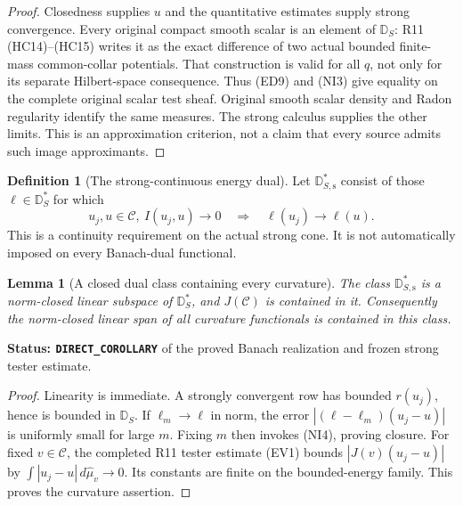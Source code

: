 \documentclass[11pt,a4paper]{article}
\numberwithin{equation}{section}
\newtheorem{lemma}[theorem]{Lemma}
\theoremstyle{definition}
\newtheorem{definition}[theorem]{Definition}
\theoremstyle{remark}
\begin{document}
\begin{proof}
Closedness supplies $u$ and the quantitative estimates supply
strong convergence. Every original compact smooth scalar is an
element of $\mathbb D_S$: R11 (HC14)--(HC15) writes it as the
exact difference of two actual bounded finite-mass common-collar
potentials. That construction is valid for all $q$, not only
for its separate Hilbert-space consequence. Thus (ED9) and
(NI3) give equality on the complete original scalar test sheaf.
Original smooth scalar density and Radon regularity identify
the same measures. The strong calculus supplies the other
limits. This is an approximation criterion, not a claim that
every source admits such image approximants.
\end{proof}

\begin{definition}[The strong-continuous energy dual]
\label{def:r12-strong-continuous-dual}
Let $\mathbb D_{S,\mathrm{s}}^*$ consist of those
$\ell\in\mathbb D_S^*$ for which
\[
  u_j,u\in\mathscr C,\ I(u_j,u)\to0
                 \quad\Longrightarrow\quad\ell(u_j)\to\ell(u).
 \tag{NI4}
\]
This is a continuity requirement on the actual strong cone.
It is not automatically imposed on every Banach-dual functional.
\end{definition}

\begin{lemma}[A closed dual class containing every curvature]
\label{lem:r12-strong-dual-closed}
The class $\mathbb D_{S,\mathrm{s}}^*$ is a norm-closed linear
subspace of $\mathbb D_S^*$, and $J(\mathscr C)$ is contained
in it. Consequently the norm-closed linear span of all curvature
functionals is contained in this class.
\end{lemma}

\noindent\textbf{Status: \texttt{DIRECT\_COROLLARY}} of the
proved Banach realization and frozen strong tester estimate.

\begin{proof}
Linearity is immediate. A strongly convergent row has bounded
$r(u_j)$, hence is bounded in $\mathbb D_S$. If $\ell_m\to\ell$
in norm, the error $|(\ell-\ell_m)(u_j-u)|$ is uniformly small
for large $m$. Fixing $m$ then invokes (NI4), proving closure.
For fixed $v\in\mathscr C$, the completed R11 tester estimate
(EV1) bounds $|J(v)(u_j-u)|$ by
$\int|u_j-u|\,d\widehat\mu_v\to0$. Its constants are finite
on the bounded-energy family. This proves the curvature assertion.
\end{proof}
\end{document}
